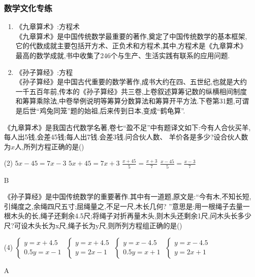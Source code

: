 \documentclass[cn,blue,12pt]{elegantbook}
\begin{document}
\subsubsection{数学文化专练}%
\begin{enumerate}
    \item 《九章算术》:方程术\\
《九章算术》是中国传统数学最重要的著作,奠定了中国传统数学的基本框架,它的代数成就主要包括开方术、正负术和方程术,其中,方程术是《九章算术》最高的数学成就,书中收集了246个与生产、生活实践有联系的应用问题.

\item 《孙子算经》:方程\\
《孙子算经》是中国古代重要的数学著作,成书大约在四、五世纪,也就是大约一千五百年前,传本的《孙子算经》共三卷,上卷叙述算筹记数的纵横相间制度和筹算乘除法,中卷举例说明等筹算分数算法和筹算开平方法.下卷第31题,可谓是后世``鸡兔同笼''题的始祖,后来传到日本,变成``鹤龟算''.
\end{enumerate}
\begin{zhenti}[resume]
\item 《九章算术》是我国古代数学名著,卷七``盈不足''中有题译文如下:今有人合伙买羊,每人出5钱,会差45钱;每人出7钱.会差3钱.问合伙人数、 羊价各是多少?设合伙人数为\(x\)人,所列方程正确的是(\qquad)\\
\begin{tasks}(2)
\task \(5x-45=7x-3\)
\task \(5x+45=7x+3\)
\task \(\frac{x+45}{5}=\frac{x+3}{7}\)
\task \(\frac{x-45}{5}=\frac{x-3}{7}\)
\end{tasks}
\begin{solution}
    B
\end{solution}
\item 《孙子算经》是中国传统数学的重要著作.其中有一道题,原文是:``今有木,不知长短,引绳度之,余绳四尺五寸;屈绳量之,不足一尺,木长几何? ''意思是:用一根绳子去量一根木头的长,绳子还剩余4.5尺;将绳子对折再量木头,则木头还剩余1尺,问木头长多少尺?可设木头长为x尺,绳子长为y尺,则所列方程组正确的是(\qquad)\\
\begin{tasks}(4)
\task \(\begin{cases} y=x+4.5\\ 0.5y=x-1\end{cases}\)
\task \(\begin{cases} y=x+4.5\\ y=2x-1\end{cases}\)
\task \(\begin{cases} y=x-4.5\\ 0.5y=x+1\end{cases}\)
\task \(\begin{cases} y=x-4.5\\ y=2x+1\end{cases}\)
\end{tasks}
\begin{solution}
    A
\end{solution}
\end{zhenti}
\end{document}
